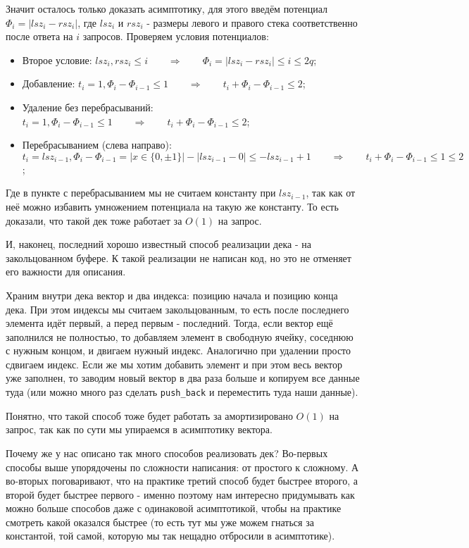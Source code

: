 Значит осталось только доказать асимптотику, для этого введём потенциал $\Phi_i = |lsz_i - rsz_i|$, где $lsz_i$ и $rsz_i$ - размеры левого и правого стека соответственно после ответа на $i$ запросов. Проверяем условия потенциалов:
\begin{itemize}
    \item Второе условие: $lsz_i, rsz_i \leq i \qquad \Rightarrow \qquad \Phi_i = |lsz_i - rsz_i| \leq i \leq 2q$;
    \item Добавление: $t_i = 1, \Phi_i - \Phi_{i-1} \leq 1 \qquad \Rightarrow \qquad t_i + \Phi_i - \Phi_{i-1} \leq 2$;
    \item Удаление без перебрасываний: $t_i = 1, \Phi_i - \Phi_{i-1} \leq 1 \qquad \Rightarrow \qquad t_i + \Phi_i - \Phi_{i-1} \leq 2$;
    \item Перебрасыванием (слева направо): $t_i = lsz_{i-1}, \Phi_i - \Phi_{i-1} = |x \in \{0, \pm 1\}| - |lsz_{i-1} - 0| \leq -lsz_{i-1} + 1 \qquad \Rightarrow \qquad t_i + \Phi_i - \Phi_{i-1} \leq 1 \leq 2$;
\end{itemize}

Где в пункте с перебрасыванием мы не считаем константу при $lsz_{i-1}$, так как от неё можно избавить умножением потенциала на такую же константу. То есть доказали, что такой дек тоже работает за $O(1)$ на запрос.



И, наконец, последний хорошо известный способ реализации дека - на закольцованном буфере. К такой реализации не написан код, но это не отменяет его важности для описания.

Храним внутри дека вектор и два индекса: позицию начала и позицию конца дека. При этом индексы мы считаем закольцованным, то есть после последнего элемента идёт первый, а перед первым - последний. Тогда, если вектор ещё заполнился не полностью, то добавляем элемент в свободную ячейку, соседнюю с нужным концом, и двигаем нужный индекс. Аналогично при удалении просто сдвигаем индекс. Если же мы хотим добавить элемент и при этом весь вектор уже заполнен, то заводим новый вектор в два раза больше и копируем все данные туда (или можно много раз сделать \texttt{push_back} и переместить туда наши данные).

Понятно, что такой способ тоже будет работать за амортизировано $O(1)$ на запрос, так как по сути мы упираемся в асимптотику вектора.

Почему же у нас описано так много способов реализовать дек? Во-первых способы выше упорядочены по сложности написания: от простого к сложному. А во-вторых поговаривают, что на практике третий способ будет быстрее второго, а второй будет быстрее первого - именно поэтому нам интересно придумывать как можно больше способов даже с одинаковой асимптотикой, чтобы на практике смотреть какой оказался быстрее (то есть тут мы уже можем гнаться за константой, той самой, которую мы так нещадно отбросили в асимптотике).


